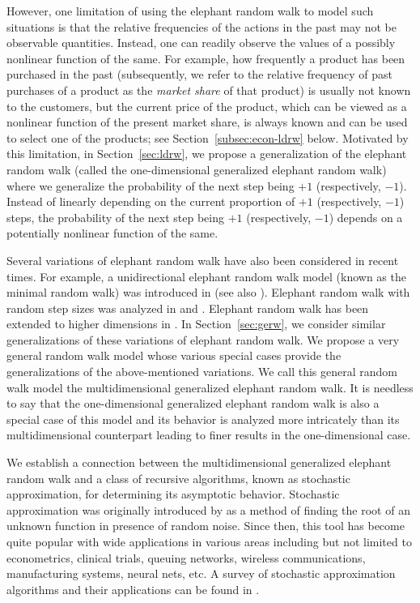 \documentclass[12pt]{amsart}
\theoremstyle{plain}
\theoremstyle{remark}
\numberwithin{equation}{section}
\begin{document}
However, one limitation of using the elephant random walk to model such situations is that the relative frequencies of the actions in the past may not be observable quantities. Instead, one can readily observe the values of a possibly nonlinear function of the same. For example, how frequently a product has been purchased in the past (subsequently, we refer to the relative frequency of past purchases of a product as the \emph{market share} of that product) is usually not known to the customers, but the current price of the product, which can be viewed as a nonlinear function of the present market share, is always known and can be used to select one of the products; see Section~\ref{subsec:econ-ldrw} below. Motivated by this limitation, in Section~\ref{sec:ldrw}, we propose a generalization of the elephant random walk (called the one-dimensional generalized elephant random walk) where we generalize the probability of the next step being $+1$ (respectively, $-1$). Instead of linearly depending on the current proportion of $+1$ (respectively, $-1$) steps, the probability of the next step being $+1$ (respectively, $-1$) depends on a potentially nonlinear function of the same.

Several variations of elephant random walk have also been considered in recent times. For example, a unidirectional elephant random walk model (known as the minimal random walk) was introduced in \cite{harbola2014memory} (see also \cite{coletti2019limit}). Elephant random walk with random step sizes was analyzed in \cite{erwrs2} and \cite{erwrs1}. Elephant random walk has been extended to higher dimensions in \cite{bercu2019multi}. In Section~\ref{sec:gerw}, we consider similar generalizations of these variations of elephant random walk. We propose a very general random walk model whose various special cases provide the generalizations of the above-mentioned variations. We call this general random walk model the multidimensional generalized elephant random walk. It is needless to say that the one-dimensional generalized elephant random walk is also a special case of this model and its behavior is analyzed more intricately than its multidimensional counterpart leading to finer results in the one-dimensional case.

We establish a connection between the multidimensional generalized elephant random walk and a class of recursive algorithms, known as stochastic approximation, for determining its asymptotic behavior. Stochastic approximation was originally introduced by \cite{robbins1951stochastic} 
as a method of finding the root of an unknown function in presence of random noise. 
Since then, this tool has become quite popular with wide applications in various areas including but not limited to econometrics, clinical trials, queuing networks, wireless communications, manufacturing systems, neural nets, etc. A survey of stochastic approximation algorithms and their applications can be found in \cite{harold1997stochastic}.
\end{document}
